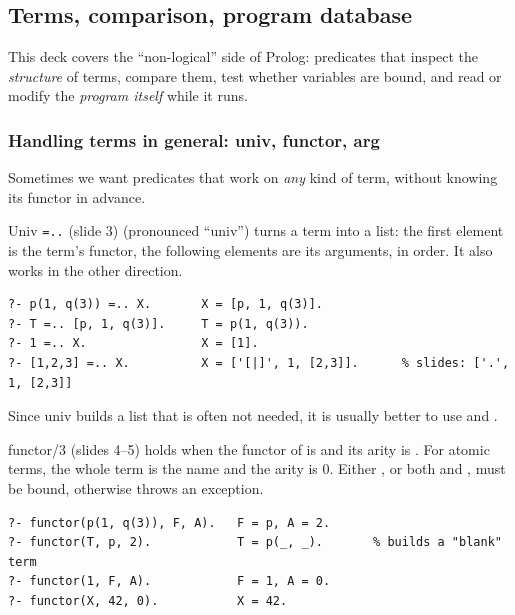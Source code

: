 \subsection{Terms, comparison, program database}
\label{sec:meta-programming}

This deck covers the ``non-logical'' side of Prolog: predicates that inspect the
\emph{structure} of terms, compare them, test whether variables are bound, and read or modify
the \emph{program itself} while it runs.

\subsubsection{Handling terms in general: univ, functor, arg}

Sometimes we want predicates that work on \emph{any} kind of term, without knowing its functor
in advance.

\begin{nbdef}{Univ \texttt{=..} (slide 3)}
 (pronounced ``univ'') turns a term into a list: the first element is the
term's functor, the following elements are its arguments, in order. It also works in the
other direction.
\begin{verbatim}
?- p(1, q(3)) =.. X.       X = [p, 1, q(3)].
?- T =.. [p, 1, q(3)].     T = p(1, q(3)).
?- 1 =.. X.                X = [1].
?- [1,2,3] =.. X.          X = ['[|]', 1, [2,3]].      % slides: ['.', 1, [2,3]]
\end{verbatim}
\end{nbdef}

Since univ builds a list that is often not needed, it is usually better to use
 and .

\begin{nbdef}{functor/3 (slides 4--5)}
 holds when the functor of  is  and its
arity is . For atomic terms, the whole term is the name and the arity is 0. Either
, or both  and , must be bound, otherwise 
throws an exception.
\begin{verbatim}
?- functor(p(1, q(3)), F, A).   F = p, A = 2.
?- functor(T, p, 2).            T = p(_, _).       % builds a "blank" term
?- functor(1, F, A).            F = 1, A = 0.
?- functor(X, 42, 0).           X = 42.
\end{verbatim}
\end{nbdef}

